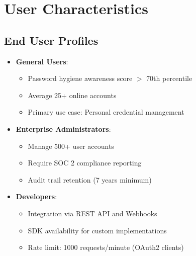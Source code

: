 \documentclass{scrreprt}
\begin{document}
\section{User Characteristics}
\label{sec:user-characteristics}

\subsection{End User Profiles}
\begin{itemize}
    \item \textbf{General Users}:
    \begin{itemize}
        \item Password hygiene awareness score $>$ 70th percentile
        \item Average 25+ online accounts
        \item Primary use case: Personal credential management
    \end{itemize}
    
    \item \textbf{Enterprise Administrators}:
    \begin{itemize}
        \item Manage 500+ user accounts
        \item Require SOC 2 compliance reporting
        \item Audit trail retention (7 years minimum)
    \end{itemize}
    
    \item \textbf{Developers}:
    \begin{itemize}
        \item Integration via REST API and Webhooks
        \item SDK availability for custom implementations
        \item Rate limit: 1000 requests/minute (OAuth2 clients)
    \end{itemize}
\end{itemize}
\end{document}
